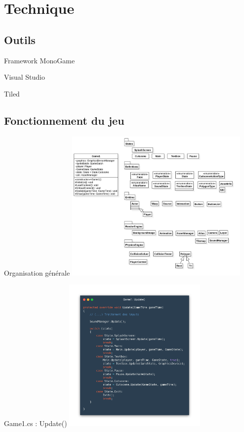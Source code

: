 \documentclass{beamer}
\begin{document}
\section{Technique}

\subsection{Outils}

\begin{frame}{Framework MonoGame}
  
\end{frame}

\begin{frame}{Visual Studio}
  
\end{frame}

\begin{frame}{Tiled}
  
\end{frame}

\subsection{Fonctionnement du jeu}

\begin{frame}{Organisation générale}
    \centering
    \includegraphics[width=9cm]{assets/uml}
\end{frame}

\begin{frame}{Game1.cs : Update()}
    \centering
    \includegraphics[width=7cm]{assets/game1update}
\end{frame}
\end{document}

